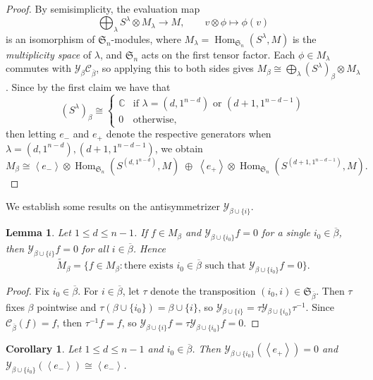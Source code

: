 \documentclass[11pt, noadjust, reqno]{amsart}
\newtheorem{lemma}[theorem]{Lemma}
\newtheorem{corollary}[theorem]{Corollary}
\theoremstyle{definition}
\theoremstyle{remark}
\numberwithin{equation}{section}
\newcommand{\0}{\emptyset}
\newcommand{\C}{\mathbb{C}}
\renewcommand{\S}{\mathfrak{S}}
\newcommand{\cC}{\mathcal{C}}
\newcommand{\cY}{\mathcal{Y}}
\DeclareMathOperator{\Hom}{Hom}
\begin{document}
\begin{proof}
By semisimplicity, the evaluation map
\[
\bigoplus_{\lambda} S^\lambda \otimes M_\lambda \longrightarrow M, \qquad v \otimes \phi \mapsto \phi(v)
\]
is an isomorphism of $\S_n$-modules, where $M_\lambda = \Hom_{\S_n}(S^\lambda, M)$ is the \emph{multiplicity space} of $\lambda$, and $\S_n$ acts on the first tensor factor. 
Each $\phi \in M_\lambda$ commutes with $\cY_\beta \cC_{\overline{\beta}}$, so applying this to both sides gives $M_\beta \cong \bigoplus_\lambda (S^\lambda)_\beta \otimes M_\lambda$.
Since by the first claim we have that 
\[
(S^\lambda)_\beta \cong \begin{cases}
    \C & \text{if } \lambda= (d,1^{n-d}) \text { or } (d+1, 1^{n-d-1}) \\
    0 & \text{otherwise},
\end{cases}
\]
then letting $e_-$ and $e_+$ denote the respective generators when $\lambda= (d,1^{n-d}), (d+1, 1^{n-d-1})$, we obtain
\[
M_\beta \cong 
\left\langle e_- \right\rangle \otimes \Hom_{\S_n}( S^{(d,1^{n-d})}, M) \; \oplus \; \left\langle e_+ \right\rangle \otimes \Hom_{\S_n}( S^{(d+1,1^{n-d-1})}, M).
\]
\end{proof}

We establish some results on the antisymmetrizer $\cY_{\beta \cup \{i\}}$.
\begin{lemma}\label{lem:simplified-criteria}
Let $ 1 \leq d \leq n-1$.
    If $f \in M_\beta$ and $\cY_{\beta \cup \{i_0\}} f =0$ for a single $i_0 \in \overline{\beta}$, then $\cY_{\beta \cup \{i\}} f = 0$ for all $i \in \overline{\beta}$. 
    Hence 
    \begin{equation*}
        \widetilde{M}_\beta = \{ f \in M_\beta  : \text{there exists } i_0 \in \overline{\beta} \text{ such that } \cY_{\beta \cup \{i_0\} }f = 0\}.
    \end{equation*}
\end{lemma}
\begin{proof}
Fix $i_0 \in \overline{\beta}$.
    For $i \in \overline{\beta}$, let $\tau$ denote the transposition $(i_0, i) \in \mathfrak{S}_{\overline{\beta}}$.
    Then $\tau$ fixes $\beta$ pointwise and $\tau(\beta \cup \{i_0\}) = \beta \cup \{i\}$, so $\cY_{\beta \cup \{i\}} = \tau \cY_{\beta \cup \{i_0\}} \tau^{-1}$.
Since $\cC_{\overline{\beta}}(f) = f$, then $\tau^{-1} f=f$, so $\cY_{\beta \cup \{i\}} f = \tau \cY_{\beta \cup \{i_0\}} f = 0$.
\end{proof}

\begin{corollary}\label{cor:antisymmetrizers-hook}
Let $1 \leq d \leq n-1$ and  $i_0 \in \overline{\beta}$. Then $\cY_{\beta \cup \{i_0\}}(\left\langle e_+ \right\rangle)=0$ and $\cY_{\beta \cup \{i_0\}}(\left\langle e_- \right\rangle)\cong \left\langle e_- \right\rangle$.
\end{corollary}
\end{document}
